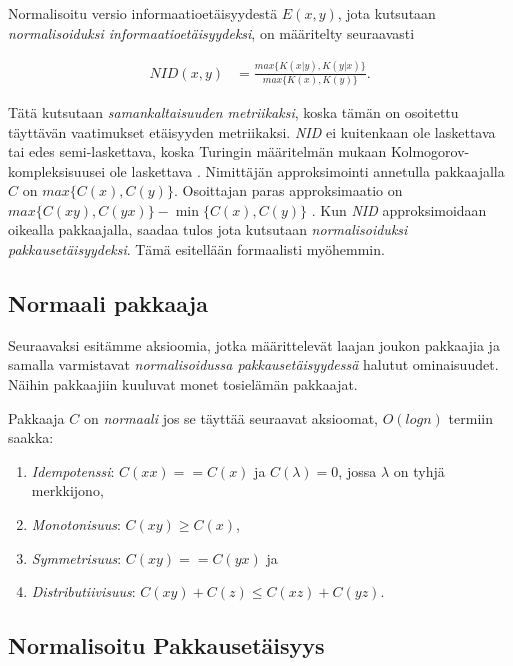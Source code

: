 \documentclass[12pt,finnish,draft]{tktltiki2}
\theoremstyle{definition}
\theoremstyle{remark}
\newcommand{\kolmogorov}{Kolmogorov-kompleksisuus}
\begin{document}
  Normalisoitu versio informaatioetäisyydestä $E(x,y)$, jota kutsutaan \emph{normalisoiduksi informaatioetäisyydeksi}, on määritelty seuraavasti

  \begin{align}
    NID(x,y) &= \frac{ max\{K{(x|y)},K{(y|x)}\} }{ max \{K(x),K(y)\}}.
  \end{align}

  Tätä kutsutaan \emph{samankaltaisuuden metriikaksi}, koska tämän on osoitettu \cite{CV05} täyttävän vaatimukset etäisyyden metriikaksi. \emph{NID} ei kuitenkaan ole laskettava tai edes semi-laskettava, koska Turingin määritelmän mukaan \kolmogorov ei ole laskettava \cite{CV05}.
  Nimittäjän approksimointi annetulla pakkaajalla $C$ on $max \{C(x),C(y)\}$. Osoittajan paras approksimaatio on $max\{C(xy),C(yx)\} - \min\{C(x),C(y)\}$ \cite{CV05}.
  Kun \emph{NID} approksimoidaan oikealla pakkaajalla, saadaa tulos jota kutsutaan \emph{normalisoiduksi pakkausetäisyydeksi}. Tämä esitellään formaalisti myöhemmin.

\subsection{Normaali pakkaaja} %
\label{sub:normaali_pakkaaja}

  Seuraavaksi esitämme aksioomia, jotka määrittelevät laajan joukon pakkaajia ja samalla varmistavat \emph{normalisoidussa pakkausetäisyydessä} halutut ominaisuudet. Näihin pakkaajiin kuuluvat monet tosielämän pakkaajat.

  Pakkaaja $C$ on \emph{normaali} jos se täyttää seuraavat aksioomat, $O(log n)$ termiin saakka:

  \begin{enumerate}
    \item \emph{Idempotenssi}: $C(xx) == C(x)$ ja $C(\lambda) = 0$, jossa $\lambda$ on tyhjä merkkijono,
    \item \emph{Monotonisuus}: $C(xy) \geq C(x)$,
    \item \emph{Symmetrisuus}: $C(xy) == C(yx)$ ja
    \item \emph{Distributiivisuus}: $C(xy) + C(z) \leq C(xz) + C(yz)$.
  \end{enumerate}

\subsection{Normalisoitu Pakkausetäisyys} %
\label{sub:normalisoitu_pakkauset_isyys}
\end{document}
